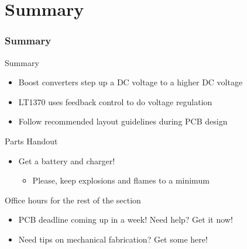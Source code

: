 \documentclass{beamer}
\begin{document}
\section{Summary} %

\begin{frame}
\frametitle{Summary}
Summary
\begin{itemize}
  \item Boost converters step up a DC voltage to a higher DC voltage
  \item LT1370 uses feedback control to do voltage regulation
  \item Follow recommended layout guidelines during PCB design
\end{itemize}
Parts Handout
\begin{itemize}
  \item Get a battery and charger!
  \begin{itemize}
    \item Please, keep explosions and flames to a minimum
  \end{itemize}
\end{itemize}
Office hours for the rest of the section
\begin{itemize}
  \item PCB deadline coming up in a week! Need help? Get it now!
  \item Need tips on mechanical fabrication? Get some here!
\end{itemize}
\end{frame}
\end{document}

